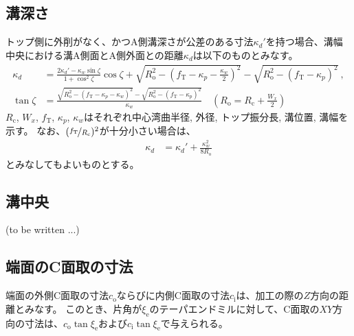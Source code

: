 \subsection{溝深さ}
トップ側に外削がなく、かつA側溝深さが公差のある寸法$\kappa_d'$を持つ場合、溝幅中央における溝A側面とA側外面との距離$\kappa_d$は以下のものとみなす。
\begin{align*}
  \kappa_d
  &= \frac{2\kappa_d'-\kappa_w\sin\zeta}{1+\cos^2\zeta}\cos\zeta
     +\sqrt{R_\mathrm o^2-\left(f_\mathrm T-\kappa_p-\frac{\kappa_w}2\right)^{\!2}}
     -\sqrt{R_\mathrm o^2-\left(f_\mathrm T-\kappa_p\right)^2}\ ,\\
  \tan\zeta
  &= \frac{\sqrt{R_\mathrm o^2-\left(f_\mathrm T-\kappa_p-\kappa_w\right)^2}
           -\sqrt{R_\mathrm o^2-\left(f_\mathrm T-\kappa_p\right)^2}}
          {\kappa_w}\quad
     \left(R_\mathrm o = R_\mathrm c+\frac{W_x}2\right)
\end{align*}
$R_\mathrm c$, $W_x$, $f_\mathrm T$, $\kappa_p$, $\kappa_w$はそれぞれ中心湾曲半径, 外径, トップ振分長, 溝位置, 溝幅を示す。
なお、$(\nicefrac{f_\mathrm T}{R_\mathrm c})^2$が十分小さい場合は、
\begin{align*}
  \kappa_d
  &= \kappa_d'+\frac{\kappa_w^2}{8R_\mathrm o}
\end{align*}
とみなしてもよいものとする。


\subsection{溝中央\TBW}
(to be written ...)



\clearpage


\subsection{端面のC面取の寸法}
端面の外側C面取の寸法$c_\mathrm o$ならびに内側C面取の寸法$c_\mathrm i$は、加工の際の$Z$方向の距離とみなす。
このとき、片角が$\xi_\mathrm e$のテーパエンドミルに対して、C面取の$XY$方向の寸法は、$c_\mathrm o\tan\xi_\mathrm e$および$c_\mathrm i\tan\xi_\mathrm e$で与えられる。


